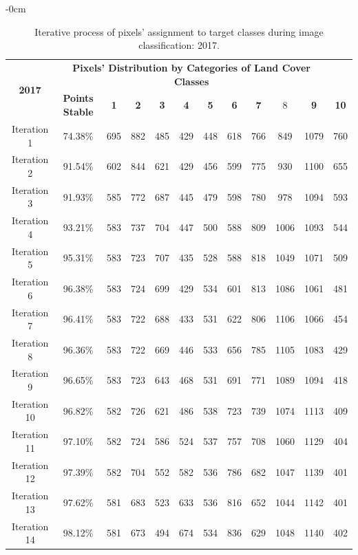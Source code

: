 \documentclass[jmse,article,accept,pdftex,oneauthor]{Definitions/mdpi}
\begin{document}
\begin{table}[H]
 \caption{Iterative process of pixels' assignment to target classes during image classification: 2017. \label{tabB3}}
 \setlength{\tabcolsep}{3.73mm}

\begin{adjustwidth}{-\extralength}{0cm}
   \begin{tabular}{cccccccccccc}
  \toprule
  \multirow{2}{*}{\textbf{2017}} & \multicolumn{10}{c}{\textbf{Pixels' Distribution by Categories of Land Cover Classes}} \\
    & \textbf{Points Stable} & \textbf{1} & \textbf{2} &  \textbf{3} & \textbf{4} & \textbf{5} & \textbf{6} & \textbf{7} & 8 & \textbf{9} & \textbf{10} \\
    \midrule
    Iteration 1 & 74.38\% & 695 & 882& 485 &429 &448& 618 & 766 & 849& 1079& 760 \\
    Iteration 2 & 91.54\% & 602 & 844 & 621 & 429 & 456 & 599 & 775 & 930 & 1100 &  655 \\
    Iteration 3 & 91.93\% & 585 & 772 & 687 & 445 &479 & 598 & 780 & 978 & 1094 & 593 \\
    Iteration 4 & 93.21\% & 583 & 737 & 704 & 447 & 500 & 588 & 809 & 1006 & 1093 &  544\\
    Iteration 5 & 95.31\% & 583 & 723 & 707 & 435 & 528 & 588 & 818 & 1049 & 1071 & 509 \\
    Iteration 6 & 96.38\% & 583 &724 & 699 & 429 & 534 & 601 & 813 &1086 &1061 & 481 \\
    Iteration 7 & 96.41\% & 583 & 722 & 688 & 433 & 531 & 622 & 806 & 1106 & 1066 & 454 \\
    Iteration 8 & 96.36\% & 583 &722 & 669 & 446 & 533 & 656& 785 & 1105 & 1083 &429 \\
    Iteration 9 & 96.65\% & 583 & 723 &643 & 468 & 531 & 691 & 771 &1089 & 1094 & 418 \\
    Iteration 10 & 96.82\% & 582 & 726 & 621 &486 &538 &723 &739 &1074  & 1113 & 409 \\
    Iteration 11 & 97.10\% & 582 & 724 & 586 &524  & 537 &757 & 708 &1060 &1129 &404 \\
     Iteration 12 & 97.39\% & 582 & 704 & 552 & 582 & 536 & 786 &682 &1047 &1139 &401 \\
     Iteration 13 & 97.62\% &  581 &683  &523 &633 &536 &816 & 652 & 1044 & 1142 &401 \\
     Iteration 14 & 98.12\% & 581 & 673 & 494 &674 &534 & 836 & 629 &1048 & 1140 &402 \\
\bottomrule
\end{tabular}
\end{adjustwidth}
 
  
\end{table}
\unskip
\end{document}
